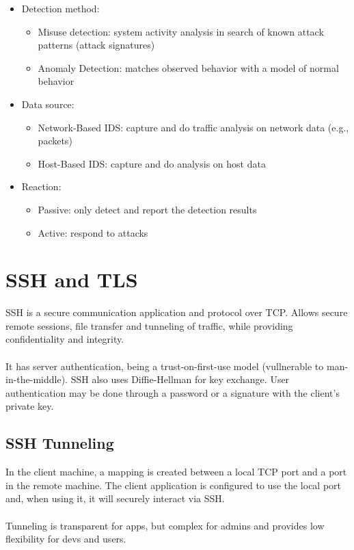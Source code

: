 \documentclass[10pt,a4paper]{report}
\begin{document}
\begin{itemize}
\item Detection method:
\begin{itemize}
\item Misuse detection: system activity analysis in search of known attack patterns (attack signatures)
\item Anomaly Detection: matches observed behavior with a model of normal behavior
\end{itemize}
\item Data source:
\begin{itemize}
\item  Network-Based IDS: capture and do traffic analysis on network data (e.g., packets)
\item Host-Based IDS: capture and do analysis on host data
\end{itemize}
\item Reaction:
\begin{itemize}
\item Passive: only detect and report the detection results
\item Active: respond to attacks
\end{itemize}
\end{itemize}

\section{SSH and TLS}
SSH is a secure communication application and
protocol over TCP. Allows secure remote sessions, file transfer and tunneling of traffic, while providing confidentiality and integrity.\\
\\
It has server authentication, being a trust-on-first-use model (vullnerable to man-in-the-middle). SSH also uses Diffie-Hellman for key exchange. User authentication may be done through a password or a signature with the client's private key.
\subsection{SSH Tunneling}
In the client machine, a mapping is created between a local TCP port and a port in the remote machine. The client application is configured to use the local port and, when using it, it will securely interact via SSH.\\
\\
Tunneling is transparent for apps, but complex for admins and provides low flexibility for devs and users.
\end{document}
